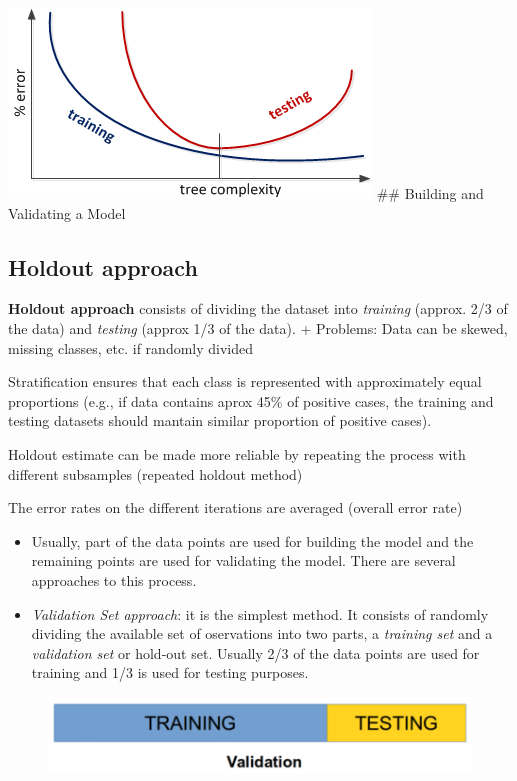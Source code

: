 \documentclass[]{book}
\providecommand{\tightlist}{%
  \setlength{\itemsep}{0pt}\setlength{\parskip}{0pt}}
\theoremstyle{definition}
\theoremstyle{definition}
\theoremstyle{remark}
\begin{document}
{\includegraphics{figures/overfittingTrees.png} \#\# Building and
Validating a Model

\subsection{Holdout approach}\label{holdout-approach}

\textbf{Holdout approach} consists of dividing the dataset into
\emph{training} (approx. 2/3 of the data) and \emph{testing} (approx 1/3
of the data). + Problems: Data can be skewed, missing classes, etc. if
randomly divided

Stratification ensures that each class is represented with approximately
equal proportions (e.g., if data contains aprox 45\% of positive cases,
the training and testing datasets should mantain similar proportion of
positive cases).

Holdout estimate can be made more reliable by repeating the process with
different subsamples (repeated holdout method)

The error rates on the different iterations are averaged (overall error
rate)

\begin{itemize}
\tightlist
\item
  Usually, part of the data points are used for building the model and
  the remaining points are used for validating the model. There are
  several approaches to this process.
\item
  \emph{Validation Set approach}: it is the simplest method. It consists
  of randomly dividing the available set of oservations into two parts,
  a \emph{training set} and a \emph{validation set} or hold-out set.
  Usually 2/3 of the data points are used for training and 1/3 is used
  for testing purposes.
\end{itemize}

\begin{figure}[htbp]
\centering
\includegraphics{figures/validation.png}
\caption{}
\end{figure}

}
\end{document}
